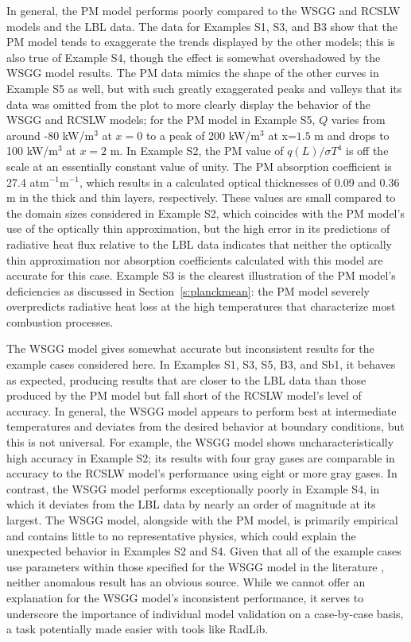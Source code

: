 \documentclass[preprint,12pt]{elsarticle}
\begin{document}
In general, the PM model performs poorly compared to the WSGG and RCSLW models and the LBL data. The data for Examples S1, S3, and B3 show that the PM model tends to exaggerate the trends displayed by the other models; this is also true of Example S4, though the effect is somewhat overshadowed by the WSGG model results. The PM data mimics the shape of the other curves in Example S5 as well, but with such greatly exaggerated peaks and valleys that its data was omitted from the plot to more clearly display the behavior of the WSGG and RCSLW models; for the PM model in Example S5, $Q$ varies from around -80 kW/m$^3$ at $x=0$ to a peak of 200 kW/m$^3$ at x=$1.5$ m and drops to 100 kW/m$^3$ at $x=2$ m. 
In Example S2, the PM value of $q(L)/\sigma T^4$ is off the scale at an essentially constant value of unity. The PM absorption coefficient is 27.4 atm$^{-1}$m$^{-1}$, which results in a calculated optical thicknesses of 0.09 and 0.36 m in the thick and thin layers, respectively. These values are small compared to the domain sizes considered in Example S2, which coincides with the PM model's use of the optically thin approximation, but the high error in its predictions of radiative heat flux relative to the LBL data indicates that neither the optically thin approximation nor absorption coefficients calculated with this model are accurate for this case. Example S3 is the clearest illustration of the PM model's deficiencies as discussed in Section~\ref{s:planckmean}: the PM model severely overpredicts radiative heat loss at the high temperatures that characterize most combustion processes. 

The WSGG model gives somewhat accurate but inconsistent results for the example cases considered here. In Examples S1, S3, S5, B3, and Sb1, it behaves as expected, producing results that are closer to the LBL data than those produced by the PM model but fall short of the RCSLW model's level of accuracy. In general, the WSGG model appears to perform best at intermediate temperatures and deviates from the desired behavior at boundary conditions, but this is not universal. For example, the WSGG model shows uncharacteristically high accuracy in Example S2; its results with four gray gases are comparable in accuracy to the RCSLW model's performance using eight or more gray gases. In contrast, the WSGG model performs exceptionally poorly in Example S4, in which it deviates from the LBL data by nearly an order of magnitude at its largest. 
The WSGG model, alongside with the PM model, is primarily empirical and contains little to no representative physics, which could explain the unexpected behavior in Examples S2 and S4. Given that all of the example cases use parameters within those specified for the WSGG model in the literature \cite{Bordbar_2014,Bordbar_2020}, neither anomalous result has an obvious source. While we cannot offer an explanation for the WSGG model's inconsistent performance, it serves to underscore the importance of individual model validation on a case-by-case basis, a task potentially made easier with tools like RadLib. 
\end{document}
